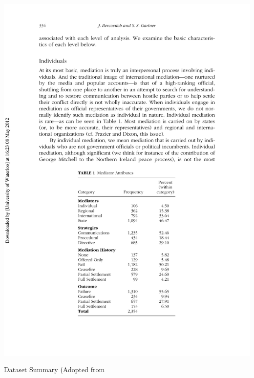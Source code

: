 \documentclass[letterpaper,12pt,titlepage,oneside,final]{book}
\begin{document}
\begin{center}
\begin{table}[h!]
\centering
\includegraphics[scale=1]{PDF-IMG/table_mad.pdf}

\caption{Dataset Summary (Adopted from \citet{bercovitch2006}}

\label{tbl:tmad}
\end{table}
\end{center}
\end{document}
